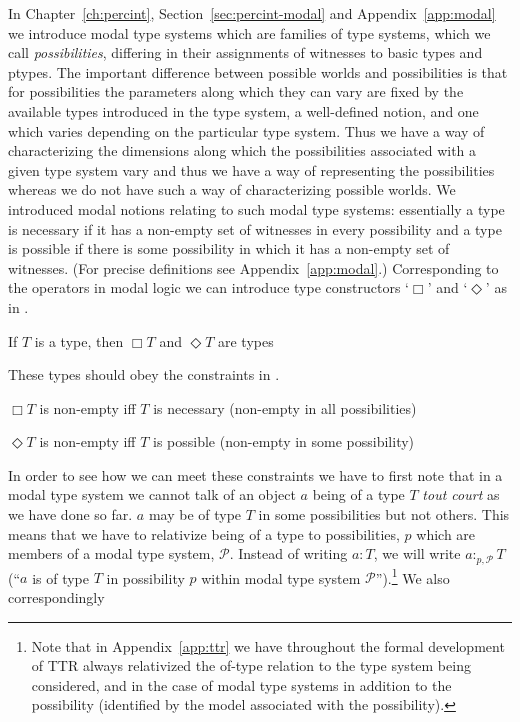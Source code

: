 In Chapter~\ref{ch:percint}, Section~\ref{sec:percint-modal} and
Appendix~\ref{app:modal} we introduce modal type systems which are
families of type systems, which we call \textit{possibilities}, differing in their assignments of
witnesses to basic types and ptypes.  The important difference between
possible worlds and possibilities is that for possibilities the
parameters along which they can vary are fixed by the available types
introduced in the type system, a well-defined notion, and one which
varies depending on the particular type system.  Thus we have a way of
characterizing the dimensions along which the possibilities associated
with a given type system vary and thus we have a way of representing the
possibilities whereas we do not have such a way of characterizing
possible worlds.  We introduced modal notions
relating to such modal type systems:  essentially a type is necessary
if it has a non-empty set of witnesses in every possibility and a type
is possible if there is some possibility in which it has a non-empty
set of witnesses.  (For precise definitions see
Appendix~\ref{app:modal}.) Corresponding to the operators in modal
logic we can introduce type constructors `$\Box$' and `$\Diamond$' as
in \nexteg{}.
\begin{ex} 
If $T$ is a type, then $\Box T$ and $\Diamond T$ are types 
\end{ex}
These types should obey the constraints in \nexteg{}.
\begin{ex} 
\begin{subex} 
 
\item $\Box T$ is non-empty iff $T$ is necessary (non-empty in all possibilities) 
 
\item $\Diamond T$ is non-empty iff $T$ is possible (non-empty in some possibility) 
 
\end{subex} 
\label{ex:modalconds}   
\end{ex} 
In order to see how we can meet these constraints we have to first
note that in a modal type system we cannot talk of an object $a$ being
of a type $T$ \textit{tout court} as we have done so far.  $a$ may be
of type $T$ in some possibilities but not others.  This means that we
have to relativize being of a type to possibilities,
$p$ which are members of a modal type system, $\mathcal{P}$. Instead of writing $a:T$, we will write $a:_{p,\mathcal{P}} T$ (``$a$ is of
type $T$ in possibility $p$ within modal type system $\mathcal{P}$'').\footnote{Note that in Appendix~\ref{app:ttr} we have throughout
  the formal development of TTR always relativized the of-type
  relation to the type system being considered, and in the case of
  modal type systems in addition to the possibility (identified by the
  model associated with the possibility).} We also correspondingly
